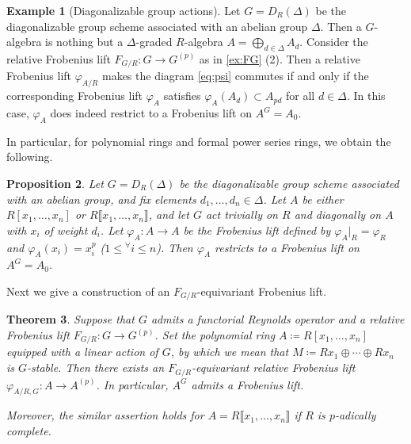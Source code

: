 \documentclass[uplatex,11pt,a4paper]{amsart} %
\numberwithin{equation}{section}
\numberwithin{figure}{section}
\numberwithin{table}{section}
\theoremstyle{plain}
\newtheorem{theorem}{Theorem}[section]
\newtheorem{proposition}[theorem]{Proposition}
\theoremstyle{definition}
\newtheorem{example}[theorem]{Example}
\begin{document}

\begin{example}[Diagonalizable group actions]
\label{ex:diagF}
Let $G=D_R(\Delta)$ be the diagonalizable group scheme associated with an abelian group $\Delta$. Then a $G$-algebra is nothing but a $\Delta$-graded $R$-algebra $A=\bigoplus_{d\in\Delta}A_d$. Consider the relative Frobenius lift $F_{G/R}\colon G\to G^{(p)}$ as in \cref{ex:FG} (2). Then a relative Frobenius lift $\varphi_{A/R}$ makes the diagram \eqref{eq:psi} commutes if and only if the corresponding Frobenius lift $\varphi_A$ satisfies $\varphi_A(A_d)\subset A_{pd}$ for all $d\in\Delta$. In this case, $\varphi_A$ does indeed restrict to a Frobenius lift on $A^G=A_0$.
\end{example}

In particular, for polynomial rings and formal power series rings, we obtain the following.

\begin{proposition}
\label{prop:diagF}
Let $G=D_R(\Delta)$ be the diagonalizable group scheme associated with an abelian group, and fix elements $d_1,\ldots,d_n\in\Delta$. Let $A$ be either $R[x_1,\ldots,x_n]$ or $R\llbracket x_1,\ldots,x_n\rrbracket$, and let $G$ act trivially on $R$ and diagonally on $A$ with $x_i$ of weight $d_i$.
Let $\varphi_A\colon A\to A$ be the Frobenius lift defined by $\varphi_A|_R=\varphi_R$ and $\varphi_A(x_i)=x_i^p$ ($1\leq{}^\forall i\leq n$). Then $\varphi_A$ restricts to a Frobenius lift on $A^G=A_0$.
\end{proposition}

Next we give a construction of an $F_{G/R}$-equivariant Frobenius lift.

\begin{theorem}
\label{thm:GequivF}
Suppose that $G$ admits a functorial Reynolds operator and a relative Frobenius lift $F_{G/R}\colon G\to G^{(p)}$.
Set the polynomial ring $A\coloneqq R[x_1,\ldots,x_n]$ equipped with a linear action of $G$, by which we mean that $M\coloneqq Rx_1\oplus\cdots\oplus Rx_n$ is $G$-stable.
Then there exists an $F_{G/R}$-equivariant relative Frobenius lift $\varphi_{A/R,G}\colon A\to A^{(p)}$. In particular, $A^G$ admits a Frobenius lift.

Moreover, the similar assertion holds for $A=R\llbracket x_1,\ldots,x_n\rrbracket$ if $R$ is $p$-adically complete. 
\end{theorem}
\end{document}
